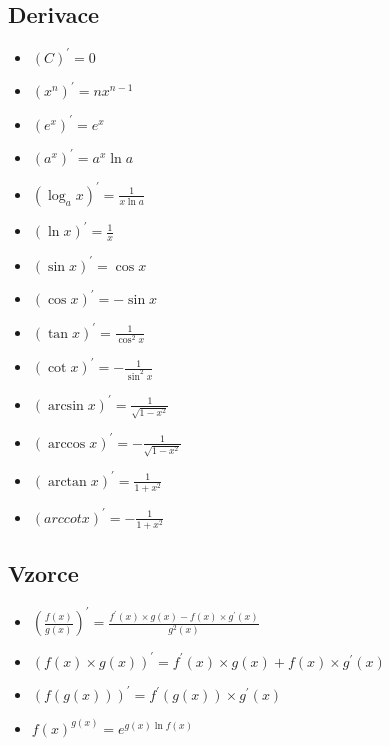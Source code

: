 \documentclass{article}
\providecommand{\arccot}{arccot}
\begin{document}
\begin{multicols}{4}
\section{Derivace}
\begin{itemize}
    \item $\left(C\right)^{\prime}=0$
    \item $\left(x^{n}\right)^{\prime}=nx^{n-1}$
    \item $\left(e^{x}\right)^{\prime}=e^{x}$
    \item $\left(a^{x}\right)^{\prime}=a^{x}\ln a$
    \item $\left(\log_{a}x\right)^{\prime}=\frac{1}{x\ln a}$
    \item $\left(\ln x\right)^{\prime}=\frac{1}{x}$
    \item $\left(\sin x\right)^{\prime}=\cos x$
    \item $\left(\cos x\right)^{\prime}=-\sin x$
    \item $\left(\tan x\right)^{\prime}=\frac{1}{\cos^{2}x}$
    \item $\left(\cot x\right)^{\prime}=-\frac{1}{\sin^{2}x}$
    \item $\left(\arcsin x\right)^{\prime}=\frac{1}{\sqrt{1-x^{2}}}$
    \item $\left(\arccos x\right)^{\prime}=-\frac{1}{\sqrt{1-x^{2}}}$
    \item $\left(\arctan x\right)^{\prime}=\frac{1}{1+x^{2}}$
    \item $\left(\arccot x\right)^{\prime}=-\frac{1}{1+x^{2}}$
\end{itemize}
\subsection{Vzorce}
\begin{itemize}
    \item $\left(\frac{f\left(x\right)}{g\left(x\right)}\right)^{\prime}=\frac{f^{\prime}\left(x\right)\times g\left(x\right)-f\left(x\right)\times g^{\prime}\left(x\right)}{g^{2}\left(x\right)}$
    \item $\left(f\left(x\right)\times g\left(x\right)\right)^{\prime}=f^{\prime}\left(x\right)\times g\left(x\right)+f\left(x\right)\times g^{\prime}\left(x\right)$
    \item $\left(f\left(g\left(x\right)\right)\right)^{\prime}=f^{\prime}\left(g\left(x\right)\right)\times g^{\prime}\left(x\right)$
    \item $f\left(x\right)^{g\left(x\right)}=e^{g\left(x\right)\ln f\left(x\right)}$
\end{itemize}

\end{multicols}
\end{document}
